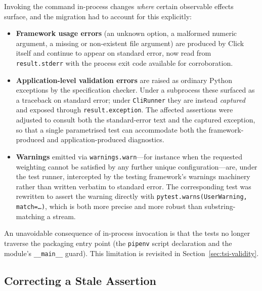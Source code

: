 \documentclass[
  digital, %
  oneside, %
  lof,     %
  nolot,     %
]{fithesis4}
\begin{document}
Invoking the command in-process changes \emph{where} certain observable effects
surface, and the migration had to account for this explicitly:

\begin{itemize}
  \item \textbf{Framework usage errors} (an unknown option, a malformed numeric
        argument, a missing or non-existent file argument) are produced by Click
        itself and continue to appear on standard error, now read from
        \texttt{result.stderr} with the process exit code available for
        corroboration.
  \item \textbf{Application-level validation errors} are raised as ordinary
        Python exceptions by the specification checker. Under a subprocess these
        surfaced as a traceback on standard error; under \texttt{CliRunner} they
        are instead \emph{captured} and exposed through
        \texttt{result.exception}. The affected assertions were adjusted to
        consult both the standard-error text and the captured exception, so that
        a single parametrised test can accommodate both the framework-produced
        and application-produced diagnostics.
  \item \textbf{Warnings} emitted via \texttt{warnings.warn}---for instance when
        the requested weighting cannot be satisfied by any further unique
        configuration---are, under the test runner, intercepted by the testing
        framework's warnings machinery rather than written verbatim to standard
        error. The corresponding test was rewritten to assert the warning
        directly with \texttt{pytest.warns(UserWarning, match=\ldots)}, which is
        both more precise and more robust than substring-matching a stream.
\end{itemize}

An unavoidable consequence of in-process invocation is that the tests no longer
traverse the packaging entry point (the \texttt{pipenv} script declaration and
the module's \texttt{\_\_main\_\_} guard). This limitation is revisited in
Section~\ref{sec:tsi-validity}.

\subsection{Correcting a Stale Assertion}
\label{sec:tsi-stale}
\end{document}
